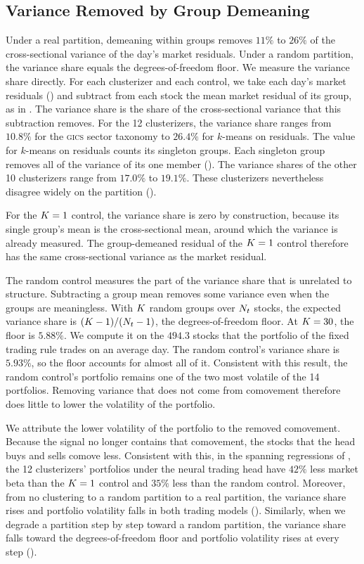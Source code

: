 \subsection{Variance Removed by Group Demeaning}
\label{sec:mechanism}

Under a real partition, demeaning within groups removes $11\%$ to $26\%$ of the cross-sectional variance of the day's market residuals. Under a random partition, the variance share equals the degrees-of-freedom floor. We measure the variance share directly. For each clusterizer and each control, we take each day's market residuals () and subtract from each stock the mean market residual of its group, as in . The variance share is the share of the cross-sectional variance that this subtraction removes. For the 12 clusterizers, the variance share ranges from $10.8\%$ for the \textsc{gics} sector taxonomy to $26.4\%$ for $k$-means on residuals. The value for $k$-means on residuals counts its singleton groups. Each singleton group removes all of the variance of its one member (). The variance shares of the other 10 clusterizers range from $17.0\%$ to $19.1\%$. These clusterizers nevertheless disagree widely on the partition ().

For the $K=1$ control, the variance share is zero by construction, because its single group's mean is the cross-sectional mean, around which the variance is already measured. The group-demeaned residual of the $K=1$ control therefore has the same cross-sectional variance as the market residual.

The random control measures the part of the variance share that is unrelated to structure. Subtracting a group mean removes some variance even when the groups are meaningless. With $K$ random groups over $N_t$ stocks, the expected variance share is $(K-1)/(N_t-1)$, the degrees-of-freedom floor. At $K=30$, the floor is $5.88\%$. We compute it on the $494.3$ stocks that the portfolio of the fixed trading rule trades on an average day. The random control's variance share is $5.93\%$, so the floor accounts for almost all of it. Consistent with this result, the random control's portfolio remains one of the two most volatile of the 14 portfolios. Removing variance that does not come from comovement therefore does little to lower the volatility of the portfolio.

We attribute the lower volatility of the portfolio to the removed comovement. Because the signal no longer contains that comovement, the stocks that the head buys and sells comove less. Consistent with this, in the spanning regressions of , the 12 clusterizers' portfolios under the neural trading head have $42\%$ less market beta than the $K=1$ control and $35\%$ less than the random control. Moreover, from no clustering to a random partition to a real partition, the variance share rises and portfolio volatility falls in both trading models (). Similarly, when we degrade a partition step by step toward a random partition, the variance share falls toward the degrees-of-freedom floor and portfolio volatility rises at every step ().


